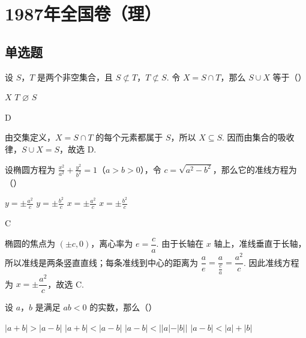 \documentclass[UTF8,a4paper,oneside,11pt]{ctexbook}
\begin{document}
\mainmatter

\chapter{1987年全国卷（理）}

\section{单选题}

\begin{problem}

设 \(S\)，\(T\) 是两个非空集合，且 \(S \not\subset T\)，\(T \not\subset S\). 令 \(X = S \cap T\)，那么 \(S \cup X\) 等于（\quad）

\choices
    {\(X\)}
    {\(T\)}
    {\(\varnothing\)}
    {\(S\)}
\end{problem}

\begin{answer}
D
\end{answer}

\begin{solution}
由交集定义，\(X=S\cap T\) 的每个元素都属于 \(S\)，所以 \(X\subseteq S\). 因而由集合的吸收律，\(S\cup X=S\)，故选 D.
\end{solution}

\begin{problem}

设椭圆方程为 \(\frac{x^2}{a^2} + \frac{y^2}{b^2} = 1\)（\(a > b > 0\)），令 \(c = \sqrt{a^2 - b^2}\)，那么它的准线方程为（\quad）

\choices
    {\(y = \pm \frac{a^2}{c}\)}
    {\(y = \pm \frac{b^2}{c}\)}
    {\(x = \pm \frac{a^2}{c}\)}
    {\(x = \pm \frac{b^2}{c}\)}
\end{problem}

\begin{answer}
C
\end{answer}

\begin{solution}
椭圆的焦点为 \(\left(\pm c,0\right)\)，离心率为 \(e=\dfrac{c}{a}\). 由于长轴在 \(x\) 轴上，准线垂直于长轴，所以准线是两条竖直直线；每条准线到中心的距离为
\(\dfrac{a}{e}=\dfrac{a}{\frac{c}{a}}=\dfrac{a^2}{c}\). 因此准线方程为 \(x=\pm\dfrac{a^2}{c}\)，故选 C.
\end{solution}

\begin{problem}

设 \(a\)，\(b\) 是满足 \(ab < 0\) 的实数，那么（\quad）

\choices
    {\(|a + b| > |a - b|\)}
    {\(|a + b| < |a - b|\)}
    {\(|a - b| < ||a| - |b||\)}
    {\(|a - b| < |a| + |b|\)}
\end{problem}
\end{document}
